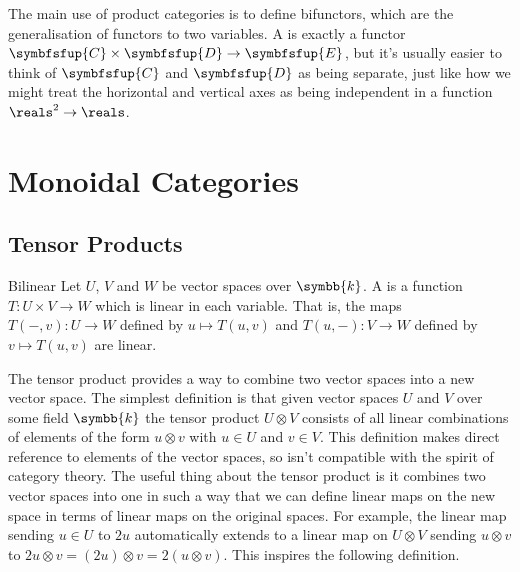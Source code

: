 \documentclass[fleqn]{NotesClass}
\newcommand{\cat}[1]{\symbfsfup{#1}}
\renewcommand{\field}{\symbb{k}}
\begin{document}
    The main use of product categories is to define bifunctors, which are the generalisation of functors to two variables.
    A  is exactly a functor \(\cat{C} \times \cat{D} \to \cat{E}\), but it's usually easier to think of \(\cat{C}\) and \(\cat{D}\) as being separate, just like how we might treat the horizontal and vertical axes as being independent in a function \(\reals^2 \to \reals\).
    
    \chapter{Monoidal Categories}
    \section{Tensor Products}
    \begin{dfn}{Bilinear}{}
        Let \(U\), \(V\) and \(W\) be vector spaces over \(\field\).
        A  is a function \(T \colon U \times V \to W\) which is linear in each variable.
        That is, the maps \(T(-, v) \colon U \to W\) defined by \(u \mapsto T(u, v)\) and \(T(u, -) \colon V \to W\) defined by \(v \mapsto T(u, v)\) are linear.
    \end{dfn}
    
    The tensor product provides a way to combine two vector spaces into a new vector space.
    The simplest definition is that given vector spaces \(U\) and \(V\) over some field \(\field\) the tensor product \(U \otimes V\) consists of all linear combinations of elements of the form \(u \otimes v\) with \(u \in U\) and \(v \in V\).
    This definition makes direct reference to elements of the vector spaces, so isn't compatible with the spirit of category theory.
    The useful thing about the tensor product is it combines two vector spaces into one in such a way that we can define linear maps on the new space in terms of linear maps on the original spaces.
    For example, the linear map sending \(u \in U\) to \(2u\) automatically extends to a linear map on \(U \otimes V\) sending \(u \otimes v\) to \(2u \otimes v = (2u) \otimes v = 2(u \otimes v)\).
    This inspires the following definition.
    
\end{document}
